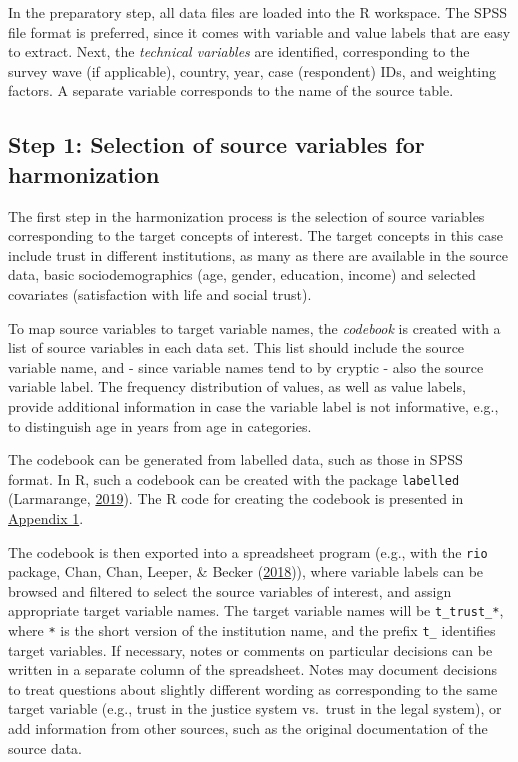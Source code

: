 \documentclass[12pt,]{article}
\begin{document}
In the preparatory step, all data files are loaded into the R workspace. The SPSS file format is preferred, since it comes with variable and value labels that are easy to extract. Next, the \emph{technical variables} are identified, corresponding to the survey wave (if applicable), country, year, case (respondent) IDs, and weighting factors. A separate variable corresponds to the name of the source table.

\hypertarget{step-1-selection-of-source-variables-for-harmonization}{%
\subsection{Step 1: Selection of source variables for harmonization}\label{step-1-selection-of-source-variables-for-harmonization}}

The first step in the harmonization process is the selection of source variables corresponding to the target concepts of interest. The target concepts in this case include trust in different institutions, as many as there are available in the source data, basic sociodemographics (age, gender, education, income) and selected covariates (satisfaction with life and social trust).

To map source variables to target variable names, the \emph{codebook} is created with a list of source variables in each data set. This list should include the source variable name, and - since variable names tend to by cryptic - also the source variable label. The frequency distribution of values, as well as value labels, provide additional information in case the variable label is not informative, e.g., to distinguish age in years from age in categories.

The codebook can be generated from labelled data, such as those in SPSS format. In R, such a codebook can be created with the package \texttt{labelled} (Larmarange, \protect\hyperlink{ref-labelled}{2019}). The R code for creating the codebook is presented in \protect\hyperlink{appendix1}{Appendix 1}.

The codebook is then exported into a spreadsheet program (e.g., with the \texttt{rio} package, Chan, Chan, Leeper, \& Becker (\protect\hyperlink{ref-rio}{2018})), where variable labels can be browsed and filtered to select the source variables of interest, and assign appropriate target variable names. The target variable names will be \texttt{t\_trust\_*}, where \texttt{*} is the short version of the institution name, and the prefix \texttt{t\_} identifies target variables. If necessary, notes or comments on particular decisions can be written in a separate column of the spreadsheet. Notes may document decisions to treat questions about slightly different wording as corresponding to the same target variable (e.g., trust in the justice system vs.~trust in the legal system), or add information from other sources, such as the original documentation of the source data.
\end{document}
